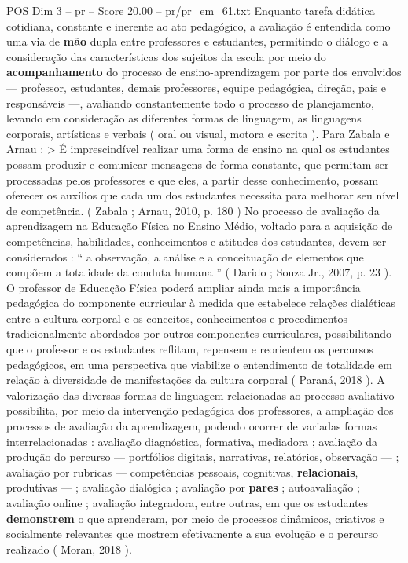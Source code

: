 \begin{textsample}{POS Dim 3 – pr – Score 20.00 – pr/pr\_em\_61.txt}
Enquanto tarefa didática cotidiana, constante e inerente ao ato pedagógico, a avaliação é entendida como uma via de \textbf{mão} dupla entre professores e estudantes, permitindo o diálogo e a consideração das características dos sujeitos da escola por meio do \textbf{acompanhamento} do processo de ensino-aprendizagem por parte dos envolvidos — professor, estudantes, demais professores, equipe pedagógica, direção, pais e responsáveis —, avaliando constantemente todo o processo de planejamento, levando em consideração as diferentes formas de linguagem, as linguagens corporais, artísticas e verbais ( oral ou visual, motora e escrita ).
Para Zabala e Arnau : > É imprescindível realizar uma forma de ensino na qual os estudantes possam produzir e comunicar mensagens de forma constante, que permitam ser processadas pelos professores e que eles, a partir desse conhecimento, possam oferecer os auxílios que cada um dos estudantes necessita para melhorar seu nível de competência. ( Zabala ; Arnau, 2010, p. 180 ) No processo de avaliação da aprendizagem na Educação Física no Ensino Médio, voltado para a aquisição de competências, habilidades, conhecimentos e atitudes dos estudantes, devem ser considerados : “ a observação, a análise e a conceituação de elementos que compõem a totalidade da conduta humana ” ( Darido ; Souza Jr., 2007, p. 23 ).
O professor de Educação Física poderá ampliar ainda mais a importância pedagógica do componente curricular à medida que estabelece relações dialéticas entre a cultura corporal e os conceitos, conhecimentos e procedimentos tradicionalmente abordados por outros componentes curriculares, possibilitando que o professor e os estudantes reflitam, repensem e reorientem os percursos pedagógicos, em uma perspectiva que viabilize o entendimento de totalidade em relação à diversidade de manifestações da cultura corporal ( Paraná, 2018 ).
A valorização das diversas formas de linguagem relacionadas ao processo avaliativo possibilita, por meio da intervenção pedagógica dos professores, a ampliação dos processos de avaliação da aprendizagem, podendo ocorrer de variadas formas interrelacionadas : avaliação diagnóstica, formativa, mediadora ; avaliação da produção do percurso — portfólios digitais, narrativas, relatórios, observação — ; avaliação por rubricas — competências pessoais, cognitivas, \textbf{relacionais}, produtivas — ; avaliação dialógica ; avaliação por \textbf{pares} ; autoavaliação ; avaliação online ; avaliação integradora, entre outras, em que os estudantes \textbf{demonstrem} o que aprenderam, por meio de processos dinâmicos, criativos e socialmente relevantes que mostrem efetivamente a sua evolução e o percurso realizado ( Moran, 2018 ).

\end{textsample}
